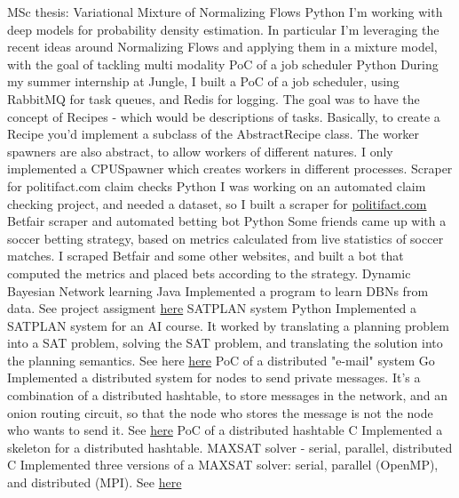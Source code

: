 \documentclass[]{colobas-cv}
\begin{document}
\entry
  {}
  {MSc thesis: Variational Mixture of Normalizing Flows}
  {Python}
  {I'm working with deep models for probability density estimation. In particular
   I'm leveraging the recent ideas around Normalizing Flows and applying them
   in a mixture model, with the goal of tackling multi modality}
\entry
  {}
  {PoC of a job scheduler}
  {Python}
  {During my summer internship at Jungle, I built a PoC of a job scheduler,
  using RabbitMQ for task queues, and Redis for logging. The goal was to have
  the concept of Recipes - which would be descriptions of tasks. Basically,
  to create a Recipe you'd implement a subclass of the AbstractRecipe class.
  The worker spawners are also abstract, to allow workers of different natures.
  I only implemented a CPUSpawner which creates workers in different processes.}
\entry
  {}
  {Scraper for politifact.com claim checks}
  {Python}
  {I was working on an automated claim checking project, and needed a dataset,
  so I built a scraper for \href{politifact.com}{politifact.com}}
\entry
  {}
  {Betfair scraper and automated betting bot}
  {Python}
  {Some friends came up with a soccer betting strategy, based on metrics 
  calculated from live statistics of soccer matches. I scraped Betfair and some
  other websites, and built a bot that computed the metrics and placed bets
  according to the strategy.}
\entry
  {}
  {Dynamic Bayesian Network learning}
  {Java}
  {Implemented a program to learn DBNs from data. See project assigment 
  \href{https://fenix.tecnico.ulisboa.pt/downloadFile/1689468335554723/apresentacao-projecto-POO1415.pdf}{here}}
\entry
  {}
  {SATPLAN system}
  {Python}
  {Implemented a SATPLAN system for an AI course. It worked by translating a
  planning problem into a SAT problem, solving the SAT problem, and translating
  the solution into the planning semantics. See here \href{https://github.com/colobas/ia-proj2}{here}}
\entry
  {}
  {PoC of a distributed "e-mail" system}
  {Go}
  {Implemented a distributed system for nodes to send private messages. It's a
  combination of a distributed hashtable, to store messages in the network, and
  an onion routing circuit, so that the node who stores the message is not the
  node who wants to send it. See \href{https://github.com/colobas/distributed-email}{here}}
\entry
  {}
  {PoC of a distributed hashtable}
  {C}
  {Implemented a skeleton for a distributed hashtable.}
\entry
  {}
  {MAXSAT solver - serial, parallel, distributed}
  {C}
  {Implemented three versions of a MAXSAT solver: serial, parallel (OpenMP), and
  distributed (MPI). See \href{https://github.com/colobas/maxsat-solver}{here}}
\end{document}
